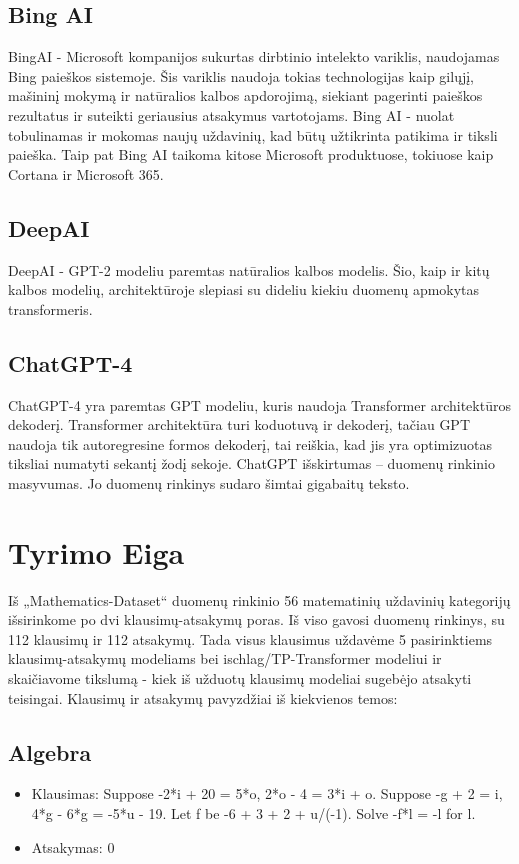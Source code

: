 \documentclass[conference]{IEEEtran}
\begin{document}
\subsection{Bing AI}
BingAI - Microsoft kompanijos sukurtas dirbtinio intelekto variklis, naudojamas Bing paieškos sistemoje. Šis variklis naudoja tokias technologijas kaip gilųjį, mašininį mokymą ir natūralios kalbos apdorojimą, siekiant pagerinti paieškos rezultatus ir suteikti geriausius atsakymus vartotojams. Bing AI - nuolat tobulinamas ir mokomas naujų uždavinių, kad būtų užtikrinta patikima ir tiksli paieška. Taip pat Bing AI taikoma kitose Microsoft produktuose, tokiuose kaip Cortana ir Microsoft 365.

\subsection{DeepAI}
DeepAI - GPT-2 modeliu paremtas natūralios kalbos modelis. Šio, kaip ir kitų kalbos modelių, architektūroje slepiasi su dideliu kiekiu duomenų apmokytas transformeris.

\subsection{ChatGPT-4}
ChatGPT-4 yra paremtas GPT modeliu, kuris naudoja Transformer architektūros dekoderį. Transformer architektūra turi koduotuvą ir dekoderį, tačiau GPT naudoja tik autoregresine formos dekoderį, tai reiškia, kad jis yra optimizuotas tiksliai numatyti sekantį žodį sekoje. ChatGPT išskirtumas – duomenų rinkinio masyvumas. Jo duomenų rinkinys sudaro šimtai gigabaitų teksto.
\section{Tyrimo Eiga}
Iš „Mathematics-Dataset“ duomenų rinkinio 56 matematinių uždavinių kategorijų išsirinkome
po dvi klausimų-atsakymų poras. Iš viso gavosi duomenų rinkinys, su 112 klausimų ir 112 atsakymų.
Tada visus klausimus uždavėme 5 pasirinktiems klausimų-atsakymų modeliams bei ischlag/TP-Transformer modeliui ir skaičiavome
tikslumą - kiek iš užduotų klausimų modeliai sugebėjo atsakyti teisingai.
Klausimų ir atsakymų pavyzdžiai iš kiekvienos temos:
\subsection{Algebra}
\begin{itemize}
    \item Klausimas: Suppose -2*i + 20 = 5*o, 2*o - 4 = 3*i + o. Suppose -g + 2 = i, 4*g - 6*g = -5*u - 19. Let f be -6 + 3 + 2 + u/(-1). Solve -f*l = -l for l.
    \item Atsakymas: 0
\end{itemize}
\end{document}
